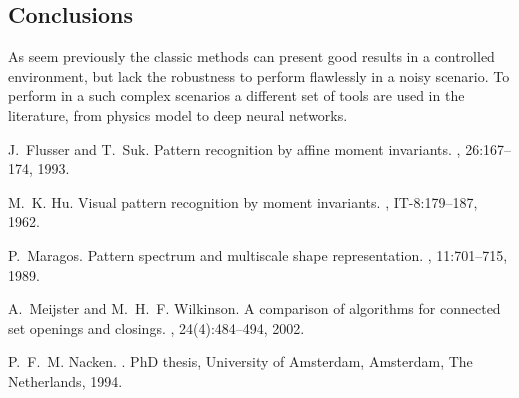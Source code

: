 \documentclass{sciposter}
\begin{document}
\begin{multicols}{3}
\section{Conclusions}

As seem previously the classic methods can present good results in a controlled environment, but lack the robustness to perform flawlessly in a noisy scenario. To perform in a such complex scenarios a different set of tools are used in the literature, from physics model to deep neural networks.




\begin{thebibliography}{1}

J.~Flusser and T.~Suk.
\newblock Pattern recognition by affine moment invariants.
, 26:167--174, 1993.

M.~K. Hu.
\newblock Visual pattern recognition by moment invariants.
, IT-8:179--187, 1962.

P.~Maragos.
\newblock Pattern spectrum and multiscale shape representation.
, 11:701--715, 1989.

A.~Meijster and M.~H.~F. Wilkinson.
\newblock A comparison of algorithms for connected set openings and closings.
, 24(4):484--494, 2002.

P.~F.~M. Nacken.
.
\newblock PhD thesis, University of Amsterdam, Amsterdam, The Netherlands,
  1994.

\end{thebibliography}

\end{multicols}
\end{document}
